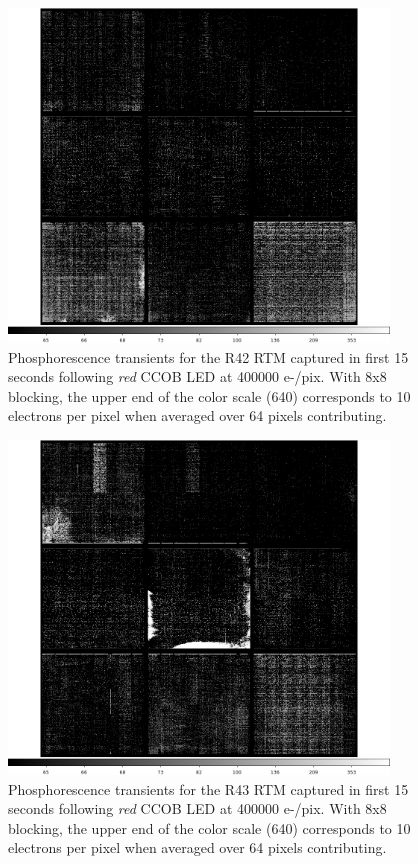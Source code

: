 \begin{figure}[htbp]
\centering
\includegraphics[width=0.9\textwidth]{sections/figures/phosphorescence-survey/itl_fluor_R42_0-19_rb1_log.png}
\caption{Phosphorescence transients for the R42 RTM captured in first 15 seconds following {\it red} CCOB LED at 400000 e-/pix. With 8x8 blocking, the upper end of the color scale (640) corresponds to 10 electrons per pixel when averaged over 64 pixels contributing.}
\label{fig:phos:R42}
\end{figure}

\begin{figure}[htbp]
\centering
\includegraphics[width=0.9\textwidth]{sections/figures/phosphorescence-survey/itl_fluor_R43_0-19_rb1_log.png}
\caption{Phosphorescence transients for the R43 RTM captured in first 15 seconds following {\it red} CCOB LED at 400000 e-/pix. With 8x8 blocking, the upper end of the color scale (640) corresponds to 10 electrons per pixel when averaged over 64 pixels contributing.}
\label{fig:phos:R43}
\end{figure}

